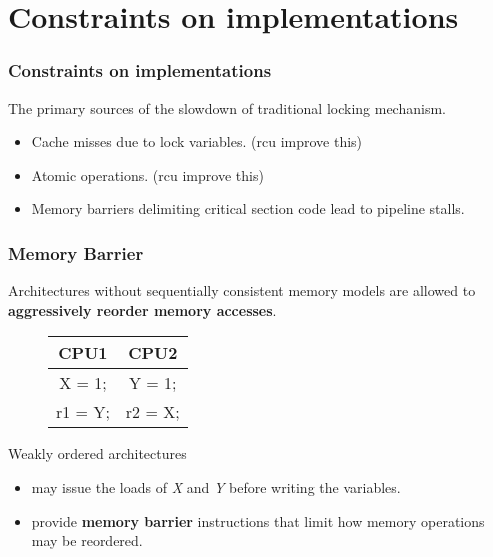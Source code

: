 \documentclass{beamer}
\begin{document}

\section{Constraints on implementations}


\begin{frame}[t]
  \frametitle{Constraints on implementations}
  The primary sources of the slowdown of traditional locking mechanism.

  \begin{itemize}
  \item Cache misses due to lock variables. (rcu improve this)
  \item Atomic operations. (rcu improve this)
  \item Memory barriers delimiting critical section code lead to pipeline stalls.
  \end{itemize}

\end{frame}


\begin{frame}[t]
  \frametitle{Memory Barrier}
  Architectures without sequentially consistent memory models are allowed
  to \textbf{aggressively reorder memory accesses}.

  \begin{figure}
    \begin{tabular}{c c}
      CPU1 & CPU2 \\
      \midrule
      X = 1; & Y = 1;\\
      r1 = Y; & r2 = X;
    \end{tabular}
  \end{figure}

  Weakly ordered architectures
  \begin{itemize}
  \item may issue the loads of \emph{X} and \emph{Y} before writing the variables.
  \item provide \textbf{memory barrier} instructions that limit how memory operations
    may be reordered.
  \end{itemize}
  
\end{frame}
\end{document}
